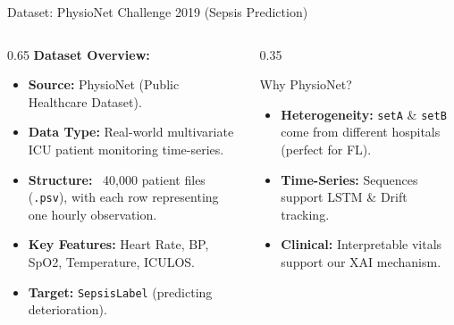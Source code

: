\documentclass[aspectratio=169, 11pt]{beamer}
\begin{document}
\begin{frame}{Dataset: PhysioNet Challenge 2019 (Sepsis Prediction)}
    \begin{columns}
        \begin{column}{0.65\textwidth}
            \textbf{Dataset Overview:}
            \begin{itemize}
                \item \textbf{Source:} PhysioNet (Public Healthcare Dataset).
                \item \textbf{Data Type:} Real-world multivariate ICU patient monitoring time-series.
                \item \textbf{Structure:} ~40,000 patient files (\texttt{.psv}), with each row representing one hourly observation.
                \item \textbf{Key Features:} Heart Rate, BP, SpO2, Temperature, ICULOS.
                \item \textbf{Target:} \texttt{SepsisLabel} (predicting deterioration).
            \end{itemize}
        \end{column}
        \begin{column}{0.35\textwidth}
            \begin{block}{Why PhysioNet?}
                \small
                \begin{itemize}
                    \item \textbf{Heterogeneity:} \texttt{setA} \& \texttt{setB} come from different hospitals (perfect for FL).
                    \item \textbf{Time-Series:} Sequences support LSTM \& Drift tracking.
                    \item \textbf{Clinical:} Interpretable vitals support our XAI mechanism.
                \end{itemize}
            \end{block}
        \end{column}
    \end{columns}
\end{frame}
\end{document}
